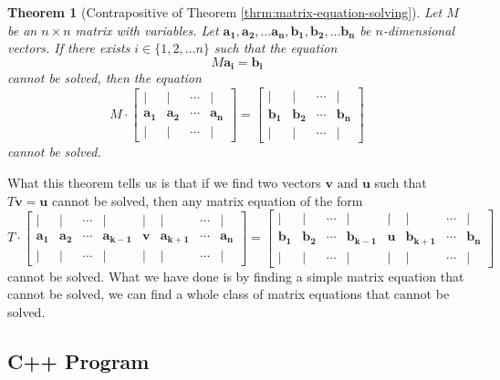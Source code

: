 \documentclass[a4paper,10pt]{article}
\theoremstyle{plain}
\newtheorem{Theorem}{Theorem}
\theoremstyle{definition}
\theoremstyle{remark}
\renewcommand{\vec}[1]{\mathbf{#1}}
\begin{document}
\begin{Theorem}[Contrapositive of Theorem \ref{thrm:matrix-equation-solving}]
	Let \( M \) be an \( n \times n \) matrix with variables.
	Let \( \vec{a_1}, \vec{a_2}, \dots \vec{a_n}, \vec{b_1}, \vec{b_2}, \dots \vec{b_n} \) be \( n \)-dimensional vectors.
	If there exists \( i \in \{1, 2, \dots n\} \) such that the equation \[M\vec{a_i} = \vec{b_i}\] cannot be solved,
	then the equation \[
	M
	\cdot
	\begin{bmatrix}
		| & | & \cdots & |\\
		\vec{a_1} & \vec{a_2} & \cdots & \vec{a_n} \\
		| & | & \cdots & |
	\end{bmatrix}
	=
	\begin{bmatrix}
		| & | & \cdots & |\\
		\vec{b_1} & \vec{b_2} & \cdots & \vec{b_n} \\
		| & | & \cdots & |
	\end{bmatrix}
	\]
	cannot be solved.
\end{Theorem}
What this theorem tells us is that if we find two vectors \( \vec{v} \text{ and } \vec{u} \) such that \( T\vec{v} = \vec{u} \) cannot be solved,
then any matrix equation of the form \[
	T
	\cdot
	\begin{bmatrix}
		| & | & \cdots & | & | & | & \cdots & |\\
		\vec{a_1} & \vec{a_2} & \cdots & \vec{a_{k-1}} & \vec{v} & \vec{a_{k+1}} & \cdots & \vec{a_n} \\
		| & | & \cdots & | & | & | & \cdots & |
	\end{bmatrix}
	=
	\begin{bmatrix}
		| & | & \cdots & | & | & | & \cdots & |\\
		\vec{b_1} & \vec{b_2} & \cdots & \vec{b_{k-1}} & \vec{u} & \vec{b_{k+1}} & \cdots & \vec{b_n} \\
		| & | & \cdots & | & | & | & \cdots & |
	\end{bmatrix}
	\]
cannot be solved.
What we have done is by finding a simple matrix equation that cannot be solved, we can find a whole class of matrix equations that cannot be solved.


\subsection{C++ Program}
\end{document}

